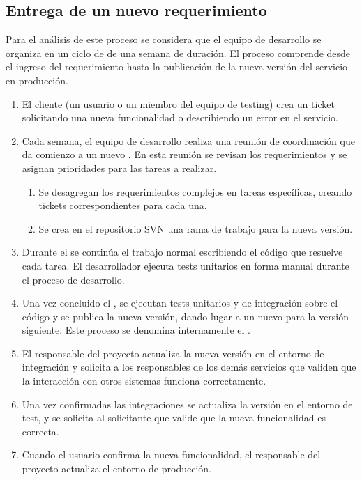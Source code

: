 \subsection{Entrega de un nuevo requerimiento}
%
Para el análisis de este proceso se considera que el equipo de
desarrollo se organiza en un ciclo de  de una semana
de duración. El proceso comprende desde el ingreso del requerimiento
hasta la publicación de la nueva versión del servicio en producción.
%
\begin{enumerate}
\item El cliente (un usuario o un miembro del equipo de testing) crea
  un ticket solicitando una nueva funcionalidad o describiendo un
  error en el servicio.
\item Cada semana, el equipo de desarrollo realiza una reunión de
  coordinación que da comienzo a un nuevo . En esta
  reunión se revisan los requerimientos y se asignan prioridades para
  las tareas a realizar.
\begin{enumerate}
\item Se desagregan los requerimientos complejos en tareas
  específicas, creando tickets correspondientes para cada una.
\item Se crea en el repositorio SVN una rama de trabajo para la nueva
  versión.
\end{enumerate}
\item Durante el  se continúa el trabajo normal
  escribiendo el código que resuelve cada tarea. El desarrollador
  ejecuta tests unitarios en forma manual durante el proceso de
  desarrollo.
\item Una vez concluido el , se ejecutan tests
  unitarios y de integración sobre el código y se publica la nueva
  versión, dando lugar a un nuevo  para la versión
  siguiente. Este proceso se denomina internamente el .
\item El responsable del proyecto actualiza la nueva versión en el
  entorno de integración y solicita a los responsables de los demás
  servicios que validen que la interacción con otros sistemas funciona
  correctamente.
\item Una vez confirmadas las integraciones se actualiza la versión en
  el entorno de test, y se solicita al solicitante que valide que la
  nueva funcionalidad es correcta.
\item Cuando el usuario confirma la nueva funcionalidad, el
  responsable del proyecto actualiza el entorno de producción.
\end{enumerate}
